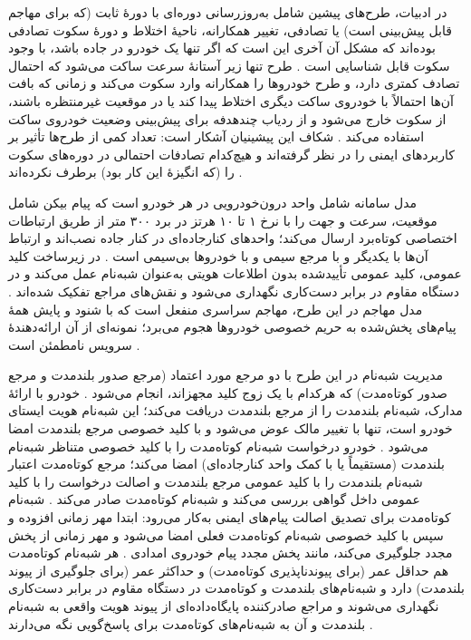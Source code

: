 \documentclass[12pt,a4paper]{article}
\begin{document}
در ادبیات، طرح‌های پیشین شامل به‌روزرسانی دوره‌ای با دورهٔ ثابت (که برای مهاجم قابل پیش‌بینی است) یا تصادفی، تغییر همکارانه، ناحیهٔ اختلاط و دورهٔ سکوت تصادفی بوده‌اند که مشکل آن آخری این است که اگر تنها یک خودرو در جاده باشد، با وجود سکوت قابل شناسایی است \cite{al-aniPrivacySafetyImprovement2023}. طرح  تنها زیر آستانهٔ سرعت ساکت می‌شود که احتمال تصادف کمتری دارد، و طرح  خودرو‌ها را همکارانه وارد سکوت می‌کند و زمانی که بافت آن‌ها احتمالاً با خودروی ساکت دیگری اختلاط پیدا کند یا در موقعیت غیرمنتظره باشند، از سکوت خارج می‌شود و از ردیاب چندهدفه برای پیش‌بینی وضعیت خودروی ساکت استفاده می‌کند \cite{al-aniPrivacySafetyImprovement2023}. شکاف این پیشینیان آشکار است: تعداد کمی از طرح‌ها تأثیر بر کاربرد‌های ایمنی را در نظر گرفته‌اند و هیچ‌کدام تصادفات احتمالی در دوره‌های سکوت را (که انگیزهٔ این کار بود) برطرف نکرده‌اند \cite{al-aniPrivacySafetyImprovement2023}.

مدل سامانه شامل واحد درون‌خودرویی در هر خودرو است که پیام بیکن شامل موقعیت، سرعت و جهت را با نرخ ۱ تا ۱۰ هرتز در برد ۳۰۰ متر از طریق ارتباطات اختصاصی کوتاه‌برد ارسال می‌کند؛ واحد‌های کنارجاده‌ای در کنار جاده نصب‌اند و ارتباط آن‌ها با یکدیگر و با مرجع سیمی و با خودرو‌ها بی‌سیمی است \cite{al-aniPrivacySafetyImprovement2023}. در زیرساخت کلید عمومی، کلید عمومی تأییدشده بدون اطلاعات هویتی به‌عنوان شبه‌نام عمل می‌کند و در دستگاه مقاوم در برابر دست‌کاری نگهداری می‌شود و نقش‌های مراجع تفکیک شده‌اند \cite{al-aniPrivacySafetyImprovement2023}. مدل مهاجم در این طرح، مهاجم سراسری منفعل است که با شنود و پایش همهٔ پیام‌های پخش‌شده به حریم خصوصی خودرو‌ها هجوم می‌برد؛ نمونه‌ای از آن ارائه‌دهندهٔ سرویس نامطمئن است \cite{al-aniPrivacySafetyImprovement2023}.

مدیریت شبه‌نام در این طرح با دو مرجع مورد اعتماد (مرجع صدور بلندمدت و مرجع صدور کوتاه‌مدت) که هرکدام با یک زوج کلید مجهز‌اند، انجام می‌شود \cite{al-aniPrivacySafetyImprovement2023}. خودرو با ارائهٔ مدارک، شبه‌نام بلندمدت را از مرجع بلندمدت دریافت می‌کند؛ این شبه‌نام هویت ایستای خودرو است، تنها با تغییر مالک عوض می‌شود و با کلید خصوصی مرجع بلندمدت امضا می‌شود \cite{al-aniPrivacySafetyImprovement2023}. خودرو درخواست شبه‌نام کوتاه‌مدت را با کلید خصوصی متناظر شبه‌نام بلندمدت (مستقیماً یا با کمک واحد کنارجاده‌ای) امضا می‌کند؛ مرجع کوتاه‌مدت اعتبار شبه‌نام بلندمدت را با کلید عمومی مرجع بلندمدت و اصالت درخواست را با کلید عمومی داخل گواهی بررسی می‌کند و شبه‌نام کوتاه‌مدت صادر می‌کند \cite{al-aniPrivacySafetyImprovement2023}. شبه‌نام کوتاه‌مدت برای تصدیق اصالت پیام‌های ایمنی به‌کار می‌رود: ابتدا مهر زمانی افزوده و سپس با کلید خصوصی شبه‌نام کوتاه‌مدت فعلی امضا می‌شود و مهر زمانی از پخش مجدد جلوگیری می‌کند، مانند پخش مجدد پیام خودروی امدادی \cite{al-aniPrivacySafetyImprovement2023}. هر شبه‌نام کوتاه‌مدت هم حداقل عمر (برای پیوندناپذیری کوتاه‌مدت) و حداکثر عمر (برای جلوگیری از پیوند بلندمدت) دارد و شبه‌نام‌های بلندمدت و کوتاه‌مدت در دستگاه مقاوم در برابر دست‌کاری نگهداری می‌شوند و مراجع صادرکننده پایگاه‌داده‌ای از پیوند هویت واقعی به شبه‌نام بلندمدت و آن به شبه‌نام‌های کوتاه‌مدت برای پاسخ‌گویی نگه می‌دارند \cite{al-aniPrivacySafetyImprovement2023}.
\end{document}
